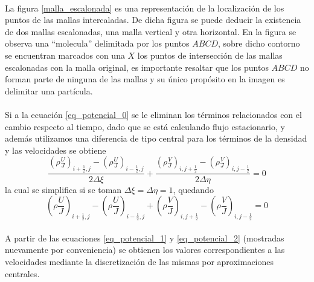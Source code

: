 \documentclass[letterpaper, openright, 12pt]{book}
\begin{document}
    \paragraph*{}
        La figura \ref{malla_escalonada} es una representación de la
        localización de los puntos de las mallas intercaladas. De dicha figura
        se puede deducir la existencia de dos mallas escalonadas, una malla
        vertical y otra horizontal. En la figura se observa una ``molecula''
        delimitada por los puntos $ABCD$, sobre dicho contorno se encuentran
        marcados con una $X$ los puntos de intersección de las mallas
        escalonadas con la malla original, es importante resaltar que los puntos
        $ABCD$ no forman parte de ninguna de las mallas y su único propósito en
        la imagen es delimitar una partícula.

    \paragraph*{}
        Si a la ecuación \ref{eq_potencial_0} se le eliminan los términos
        relacionados con el cambio respecto al tiempo, dado que se está
        calculando flujo estacionario, y además utilizamos una diferencia de
        tipo central para los términos de la densidad y las velocidades se 
        obtiene
        \begin{equation}
            \frac{\left (\rho \frac{U}{J} \right)_{i + \frac{1}{2}, j} -
                \left( \rho \frac{U}{J} \right)_{i - \frac{1}{2}, j}}{2\Delta\xi}
            + \frac{\left (\rho \frac{V}{J} \right)_{i,j + \frac{1}{2}} -
                \left( \rho \frac{V}{J} \right)_{i, j - \frac{1}{2}}}{2\Delta\eta}
            = 0
        \end{equation}
        la cual se simplifica si se toman $\Delta\xi = \Delta\eta = 1$, quedando
        \begin{equation}
            \left (\rho \frac{U}{J} \right)_{i + \frac{1}{2}, j} -
                \left( \rho \frac{U}{J} \right)_{i - \frac{1}{2}, j}
            + \left (\rho \frac{V}{J} \right)_{i,j + \frac{1}{2}} -
                \left( \rho \frac{V}{J} \right)_{i, j - \frac{1}{2}}
            = 0
            \label{eq_potencial_3}
        \end{equation}

    \paragraph*{}
        A partir de las ecuaciones \ref{eq_potencial_1} y \ref{eq_potencial_2}
        (mostradas nuevamente por conveniencia) se obtienen los valores
        correspondientes a las velocidades mediante la discretización de las
        mismas por aproximaciones centrales.
\end{document}
